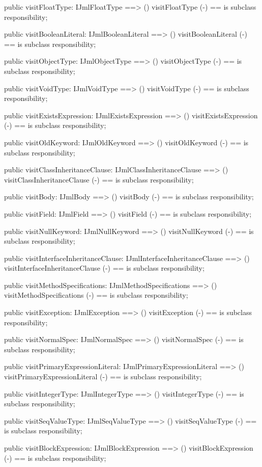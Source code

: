 \begin{vdm_al}
  public visitFloatType: IJmlFloatType ==> ()
  visitFloatType (-) == is subclass responsibility;

  public visitBooleanLiteral: IJmlBooleanLiteral ==> ()
  visitBooleanLiteral (-) == is subclass responsibility;

  public visitObjectType: IJmlObjectType ==> ()
  visitObjectType (-) == is subclass responsibility;

  public visitVoidType: IJmlVoidType ==> ()
  visitVoidType (-) == is subclass responsibility;

  public visitExistsExpression: IJmlExistsExpression ==> ()
  visitExistsExpression (-) == is subclass responsibility;

  public visitOldKeyword: IJmlOldKeyword ==> ()
  visitOldKeyword (-) == is subclass responsibility;

  public visitClassInheritanceClause: IJmlClassInheritanceClause ==> ()
  visitClassInheritanceClause (-) == is subclass responsibility;

  public visitBody: IJmlBody ==> ()
  visitBody (-) == is subclass responsibility;

  public visitField: IJmlField ==> ()
  visitField (-) == is subclass responsibility;

  public visitNullKeyword: IJmlNullKeyword ==> ()
  visitNullKeyword (-) == is subclass responsibility;

  public visitInterfaceInheritanceClause: IJmlInterfaceInheritanceClause ==> ()
  visitInterfaceInheritanceClause (-) == is subclass responsibility;

  public visitMethodSpecifications: IJmlMethodSpecifications ==> ()
  visitMethodSpecifications (-) == is subclass responsibility;

  public visitException: IJmlException ==> ()
  visitException (-) == is subclass responsibility;

  public visitNormalSpec: IJmlNormalSpec ==> ()
  visitNormalSpec (-) == is subclass responsibility;

  public visitPrimaryExpressionLiteral: IJmlPrimaryExpressionLiteral ==> ()
  visitPrimaryExpressionLiteral (-) == is subclass responsibility;

  public visitIntegerType: IJmlIntegerType ==> ()
  visitIntegerType (-) == is subclass responsibility;

  public visitSeqValueType: IJmlSeqValueType ==> ()
  visitSeqValueType (-) == is subclass responsibility;

  public visitBlockExpression: IJmlBlockExpression ==> ()
  visitBlockExpression (-) == is subclass responsibility;


\end{vdm_al}
